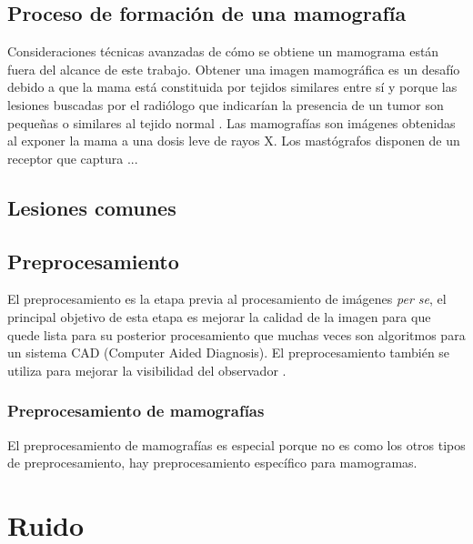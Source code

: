\subsection{Proceso de formación de una mamografía}
Consideraciones técnicas avanzadas de cómo se obtiene un mamograma están fuera
del alcance de este trabajo. Obtener una imagen mamográfica es un desafío
debido a que la mama está constituida por tejidos similares entre sí y porque
las lesiones buscadas por el radiólogo que indicarían la presencia de un tumor
son pequeñas o similares al tejido normal \cite{mx:cancer}. Las mamografías son
imágenes obtenidas al exponer la mama a una dosis leve de rayos X. Los
mastógrafos disponen de un receptor que captura ...


\subsection{Lesiones comunes}


\subsection{Preprocesamiento}
El preprocesamiento es la etapa previa al procesamiento de imágenes \textit{per
se}, el principal objetivo de esta etapa es mejorar la calidad de la imagen
para que quede lista para su posterior procesamiento \cite{ponraj2011survey}
que muchas veces son algoritmos para un sistema CAD (Computer Aided Diagnosis).
El preprocesamiento también se utiliza para mejorar la visibilidad del
observador \cite{rahmati2010new}. 

\subsubsection{Preprocesamiento de mamografías}
El preprocesamiento de mamografías es especial porque no es como los otros tipos
de preprocesamiento, hay preprocesamiento específico para mamogramas.

\section{Ruido}

